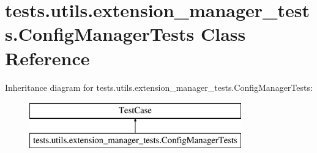 \hypertarget{classtests_1_1utils_1_1extension__manager__tests_1_1ConfigManagerTests}{\section{tests.\+utils.\+extension\+\_\+manager\+\_\+tests.\+Config\+Manager\+Tests Class Reference}
\label{classtests_1_1utils_1_1extension__manager__tests_1_1ConfigManagerTests}
}
Inheritance diagram for tests.\+utils.\+extension\+\_\+manager\+\_\+tests.\+Config\+Manager\+Tests\+:\begin{figure}[H]
\begin{center}
\leavevmode
\includegraphics[height=2.000000cm]{classtests_1_1utils_1_1extension__manager__tests_1_1ConfigManagerTests}
\end{center}
\end{figure}
